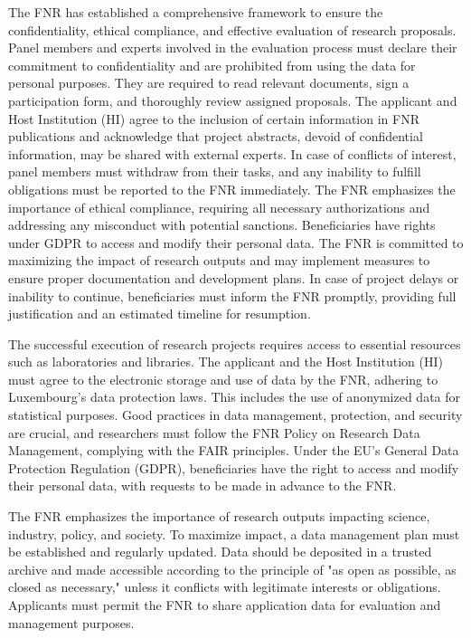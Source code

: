 \documentclass{article}
\begin{document}
The FNR has established a comprehensive framework to ensure the confidentiality, ethical compliance, and effective evaluation of research proposals. Panel members and experts involved in the evaluation process must declare their commitment to confidentiality and are prohibited from using the data for personal purposes. They are required to read relevant documents, sign a participation form, and thoroughly review assigned proposals. The applicant and Host Institution (HI) agree to the inclusion of certain information in FNR publications and acknowledge that project abstracts, devoid of confidential information, may be shared with external experts. In case of conflicts of interest, panel members must withdraw from their tasks, and any inability to fulfill obligations must be reported to the FNR immediately. The FNR emphasizes the importance of ethical compliance, requiring all necessary authorizations and addressing any misconduct with potential sanctions. Beneficiaries have rights under GDPR to access and modify their personal data. The FNR is committed to maximizing the impact of research outputs and may implement measures to ensure proper documentation and development plans. In case of project delays or inability to continue, beneficiaries must inform the FNR promptly, providing full justification and an estimated timeline for resumption.

The successful execution of research projects requires access to essential resources such as laboratories and libraries. The applicant and the Host Institution (HI) must agree to the electronic storage and use of data by the FNR, adhering to Luxembourg's data protection laws. This includes the use of anonymized data for statistical purposes. Good practices in data management, protection, and security are crucial, and researchers must follow the FNR Policy on Research Data Management, complying with the FAIR principles. Under the EU’s General Data Protection Regulation (GDPR), beneficiaries have the right to access and modify their personal data, with requests to be made in advance to the FNR.

The FNR emphasizes the importance of research outputs impacting science, industry, policy, and society. To maximize impact, a data management plan must be established and regularly updated. Data should be deposited in a trusted archive and made accessible according to the principle of "as open as possible, as closed as necessary," unless it conflicts with legitimate interests or obligations. Applicants must permit the FNR to share application data for evaluation and management purposes.
\end{document}
